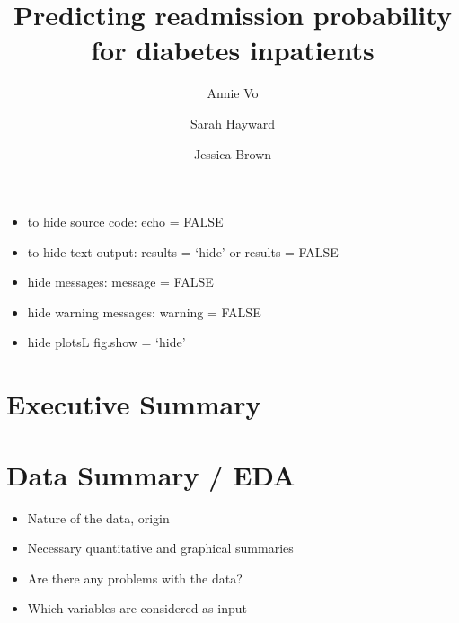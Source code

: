 \documentclass[
]{article}
\title{Predicting readmission probability for diabetes inpatients}
\author{Annie Vo \and Sarah Hayward \and Jessica Brown}
\date{}
\providecommand{\tightlist}{%
  \setlength{\itemsep}{0pt}\setlength{\parskip}{0pt}}
\begin{document}
\maketitle

{
\hypersetup{linkcolor=}
\setcounter{tocdepth}{4}
\tableofcontents
}
\begin{itemize}
\tightlist
\item
  to hide source code: echo = FALSE
\item
  to hide text output: results = `hide' or results = FALSE
\item
  hide messages: message = FALSE
\item
  hide warning messages: warning = FALSE
\item
  hide plotsL fig.show = `hide'
\end{itemize}

\hypertarget{executive-summary}{%
\section{Executive Summary}\label{executive-summary}}

\hypertarget{data-summary-eda}{%
\section{Data Summary / EDA}\label{data-summary-eda}}

\begin{itemize}
\tightlist
\item
  Nature of the data, origin
\item
  Necessary quantitative and graphical summaries
\item
  Are there any problems with the data?
\item
  Which variables are considered as input
\end{itemize}
\end{document}
